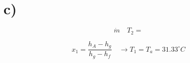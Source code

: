 

\section*{c)}

\[
\dot{m} \quad T_2 =
\]

\[
x_1 = \frac{h_A - h_g}{h_g - h_f} \quad \rightarrow T_1 = T_a = 31.33^\circ C
\]